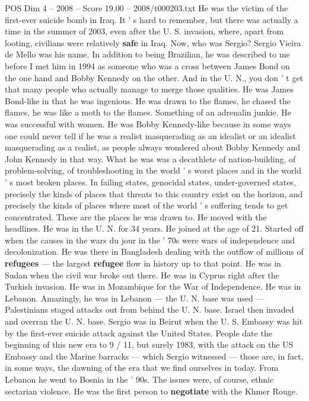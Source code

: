 \begin{textsample}{POS Dim 4 – 2008 – Score 19.00 – 2008/t000203.txt}
He was the victim of the first-ever suicide bomb in Iraq.
It ' s hard to remember, but there was actually a time in the summer of 2003, even after the U.
S. invasion, where, apart from looting, civilians were relatively \textbf{safe} in Iraq.
Now, who was Sergio?
Sergio Vieira de Mello was his name.
In addition to being Brazilian, he was described to me before I met him in 1994 as someone who was a cross between James Bond on the one hand and Bobby Kennedy on the other.
And in the U.
N., you don ' t get that many people who actually manage to merge those qualities.
He was James Bond-like in that he was ingenious.
He was drawn to the flames, he chased the flames, he was like a moth to the flames.
Something of an adrenalin junkie.
He was successful with women.
He was Bobby Kennedy-like because in some ways one could never tell if he was a realist masquerading as an idealist or an idealist masquerading as a realist, as people always wondered about Bobby Kennedy and John Kennedy in that way.
What he was was a decathlete of nation-building, of problem-solving, of troubleshooting in the world ' s worst places and in the world ' s most broken places.
In failing states, genocidal states, under-governed states, precisely the kinds of places that threats to this country exist on the horizon, and precisely the kinds of places where most of the world ' s suffering tends to get concentrated.
These are the places he was drawn to.
He moved with the headlines.
He was in the U.
N. for 34 years.
He joined at the age of 21.
Started off when the causes in the wars du jour in the ' 70s were wars of independence and decolonization.
He was there in Bangladesh dealing with the outflow of millions of \textbf{refugees} — the largest \textbf{refugee} flow in history up to that point.
He was in Sudan when the civil war broke out there.
He was in Cyprus right after the Turkish invasion.
He was in Mozambique for the War of Independence.
He was in Lebanon.
Amazingly, he was in Lebanon — the U.
N. base was used — Palestinians staged attacks out from behind the U.
N. base.
Israel then invaded and overran the U.
N. base.
Sergio was in Beirut when the U.
S.
Embassy was hit by the first-ever suicide attack against the United States.
People date the beginning of this new era to 9 / 11, but surely 1983, with the attack on the US Embassy and the Marine barracks — which Sergio witnessed — those are, in fact, in some ways, the dawning of the era that we find ourselves in today.
From Lebanon he went to Bosnia in the ' 90s.
The issues were, of course, ethnic sectarian violence.
He was the first person to \textbf{negotiate} with the Khmer Rouge.

\end{textsample}
